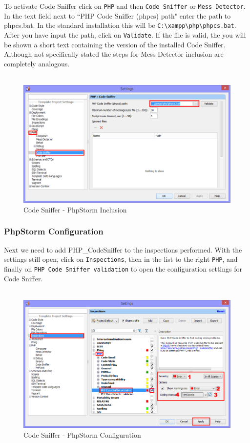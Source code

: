 \documentclass[]{report}
\begin{document}
To activate Code Sniffer click on \texttt{PHP} and then \texttt{Code Sniffer} or \texttt{Mess Detector}. In the text field next to ``PHP Code Sniffer (phpcs) path" enter the path to phpcs.bat. In the standard installation this will be \texttt{C:\textbackslash xampp\textbackslash php\textbackslash phpcs.bat}. After you have input the path, click on \texttt{Validate}. If the file is valid, the you will be shown a short text containing the version of the installed Code Sniffer. Although not specifically stated the steps for Mess Detector inclusion are completely analogous.\\
\\
\begin{figure}[h] 
	\centering
	\includegraphics[width=14cm]{codesnifferinclusion.png}
	\caption{Code Sniffer - PhpStorm Inclusion}
\end{figure}

\subsubsection{PhpStorm Configuration}

Next we need to add PHP\_CodeSniffer to the inspections performed. With the settings still open, click on \texttt{Inspections}, then in the list to the right \texttt{PHP}, and finally on \texttt{PHP Code Sniffer validation} to open the configuration settings for Code Sniffer.\\
\\
\begin{figure}[h] 
	\centering
	\includegraphics[width=14cm]{codesnifferconfiguration.png}
	\caption{Code Sniffer - PhpStorm Configuration}
	\label{fig:cspsc}
\end{figure}
\end{document}
